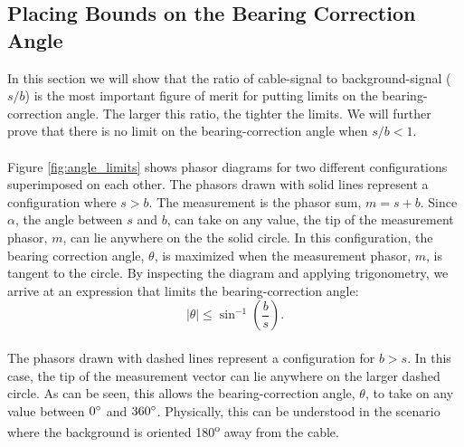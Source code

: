 \documentclass[paper=a4, fontsize=11pt]{scrartcl}
\numberwithin{equation}{section}		%
\numberwithin{figure}{section}			%
\numberwithin{table}{section}				%
\begin{document}
\begin{appendices}
\subsection{Placing Bounds on the Bearing Correction Angle}\label{section:angle_bounds}
In this section we will show that the ratio of cable-signal to background-signal ($s/b$) is the most important figure of merit for putting limits on the bearing-correction angle. The larger this ratio, the tighter the limits. We will further prove that there is no limit on the bearing-correction angle when $s/b < 1$.

\paragraph{}
Figure \ref{fig:angle_limits} shows phasor diagrams for two different configurations superimposed on each other.  The phasors drawn with solid lines represent a configuration where $s>b$.  The measurement is the phasor sum, $m=s+b$.  Since $\alpha$, the angle between $s$ and $b$, can take on any value, the tip of the measurement phasor,  $m$, can lie anywhere on the the solid circle.  In this configuration, the bearing correction angle, $\theta$, is maximized when the measurement phasor, $m$, is tangent to the circle.  By inspecting the diagram and applying trigonometry, we arrive at an expression that limits the bearing-correction angle: 
\begin{equation} \label{eq:angle_limits}
    \left| \theta \right| \leq \sin^{-1}\left(\frac{b}{s}\right).
\end{equation}

\paragraph{}
The phasors drawn with dashed lines represent a configuration for $b > s$.  In this case, the tip of the measurement vector can lie anywhere on the larger dashed circle.  As can be seen, this allows the bearing-correction angle, $\theta$, to take on any value between $0\degree$ and $360\degree$.  Physically, this can be understood in the scenario where the background is oriented 180\textsuperscript{o} away from the cable. 


\end{appendices}
\end{document}
